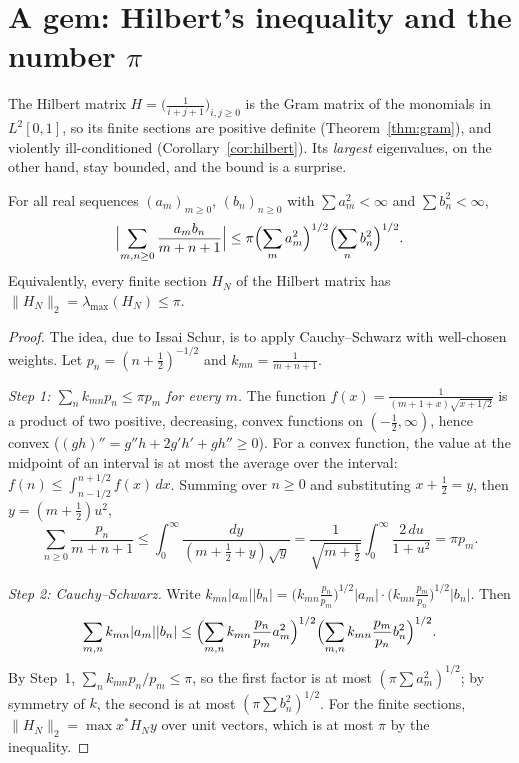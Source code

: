 \section{A gem: Hilbert's inequality and the number $\pi$}

The Hilbert matrix $H=\bigl(\frac1{i+j+1}\bigr)_{i,j\ge0}$ is the Gram matrix of the monomials in $L^2[0,1]$, so its finite sections are
positive definite (Theorem~\ref{thm:gram}), and violently ill-conditioned (Corollary~\ref{cor:hilbert}). Its \emph{largest}
eigenvalues, on the other hand, stay bounded, and the bound is a surprise.

\begin{theorem}\label{thm:hilbertineq}
For all real sequences $(a_m)_{m\ge0}$, $(b_n)_{n\ge0}$ with $\sum a_m^2<\infty$ and $\sum b_n^2<\infty$,
\[
\Bigl|\sum_{m,n\ge0}\frac{a_mb_n}{m+n+1}\Bigr|\le\pi\Bigl(\sum_ma_m^2\Bigr)^{1/2}\Bigl(\sum_nb_n^2\Bigr)^{1/2}.
\]
Equivalently, every finite section $H_N$ of the Hilbert matrix has $\|H_N\|_2=\lambda_{\max}(H_N)\le\pi$.
\end{theorem}
\begin{proof}
The idea, due to Issai Schur, is to apply Cauchy--Schwarz with well-chosen weights. Let $p_n=(n+\frac12)^{-1/2}$ and $k_{mn}=\frac1{m+n+1}$.

\emph{Step 1: $\sum_nk_{mn}p_n\le\pi p_m$ for every $m$.} The function $f(x)=\frac1{(m+1+x)\sqrt{x+1/2}}$ is a product of two positive,
decreasing, convex functions on $(-\frac12,\infty)$, hence convex ($(gh)''=g''h+2g'h'+gh''\ge0$). For a convex function, the value at the
midpoint of an interval is at most the average over the interval: $f(n)\le\int_{n-1/2}^{n+1/2}f(x)\,dx$. Summing over $n\ge0$ and
substituting $x+\frac12=y$, then $y=(m+\frac12)u^2$,
\[
\sum_{n\ge0}\frac{p_n}{m+n+1}\le\int_0^\infty\frac{dy}{(m+\frac12+y)\sqrt y}=\frac1{\sqrt{m+\frac12}}\int_0^\infty\frac{2\,du}{1+u^2}=
\pi p_m.
\]

\emph{Step 2: Cauchy--Schwarz.} Write $k_{mn}|a_m||b_n|=\bigl(k_{mn}\frac{p_n}{p_m}\bigr)^{1/2}|a_m|\cdot\bigl(k_{mn}\frac{p_m}{p_n}\bigr)^{1/2}
|b_n|$. Then
\[
\sum_{m,n}k_{mn}|a_m||b_n|\le\Bigl(\sum_{m,n}k_{mn}\frac{p_n}{p_m}a_m^2\Bigr)^{1/2}\Bigl(\sum_{m,n}k_{mn}\frac{p_m}{p_n}b_n^2\Bigr)^{1/2}.
\]
By Step~1, $\sum_nk_{mn}p_n/p_m\le\pi$, so the first factor is at most $(\pi\sum a_m^2)^{1/2}$; by symmetry of $k$, the second is at most
$(\pi\sum b_n^2)^{1/2}$. For the finite sections, $\|H_N\|_2=\max x^*H_Ny$ over unit vectors, which is at most $\pi$ by the inequality.
\end{proof}

